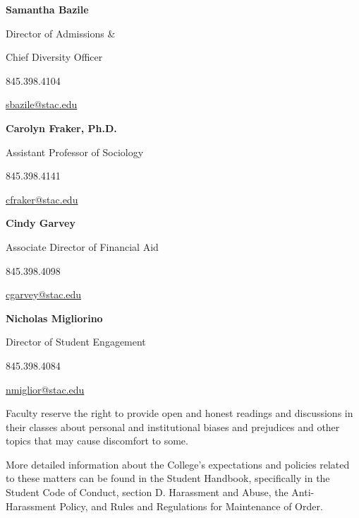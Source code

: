 \documentclass[11pt,letterpaper]{article}
\begin{document}
        \hfill\begin{minipage}[t]{0.45\textwidth}
        {\bfseries Samantha Bazile} \par
        Director of Admissions \& \par
        Chief Diversity Officer \par
        845.398.4104 \par
        \href{mailto:sbazile@stac.edu}{sbazile@stac.edu}
        \end{minipage}\begin{minipage}[t]{0.45\textwidth}
        {\bfseries Carolyn Fraker, Ph.D.} \par
        Assistant Professor of Sociology \par
        845.398.4141 \par
        \href{mailto:cfraker@stac.edu}{cfraker@stac.edu}
        \end{minipage} \pspace
        
        \hfill\begin{minipage}[t]{0.45\textwidth}
        {\bfseries Cindy Garvey} \par
        Associate Director of Financial Aid \par
        845.398.4098 \par
        \href{mailto:cgarvey@stac.edu}{cgarvey@stac.edu}
        \end{minipage}\begin{minipage}[t]{0.45\textwidth}
        {\bfseries Nicholas Migliorino} \par
        Director of Student Engagement \par
        845.398.4084 \par
        \href{mailto:nmiglior@stac.edu}{nmiglior@stac.edu}
        \end{minipage} \pspace

Faculty reserve the right to provide open and honest readings and discussions in their classes about personal and institutional biases and prejudices and other topics that may cause discomfort to some. \pspace

More detailed information about the College's expectations and policies related to these matters can be found in the Student Handbook, specifically in the Student Code of Conduct, section D. Harassment and Abuse, the Anti-Harassment Policy, and Rules and Regulations for Maintenance of Order.
\sectionbreak



\end{document}
